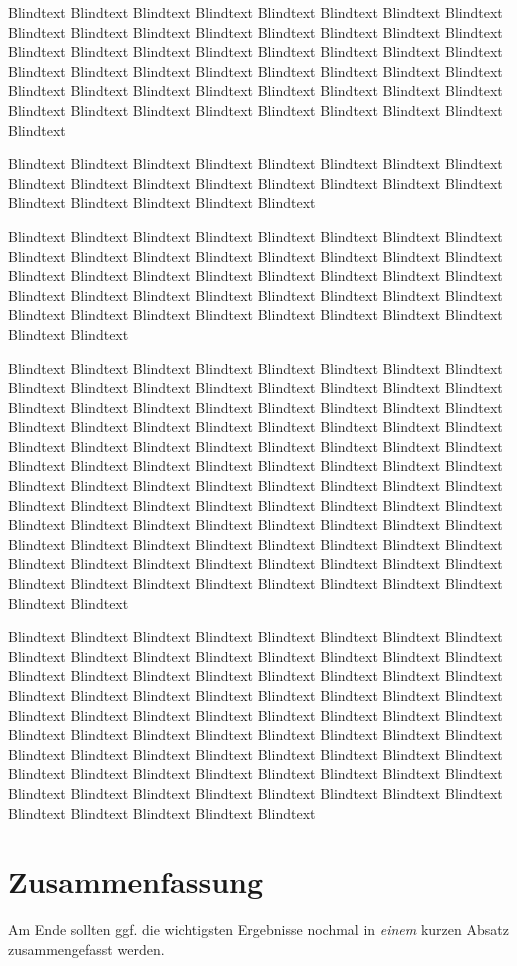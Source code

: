 Blindtext Blindtext Blindtext Blindtext Blindtext Blindtext Blindtext
Blindtext Blindtext Blindtext Blindtext Blindtext Blindtext Blindtext
Blindtext Blindtext Blindtext Blindtext Blindtext Blindtext Blindtext
Blindtext Blindtext Blindtext Blindtext Blindtext Blindtext Blindtext
Blindtext Blindtext Blindtext Blindtext Blindtext Blindtext Blindtext
Blindtext Blindtext Blindtext Blindtext Blindtext Blindtext Blindtext
Blindtext Blindtext Blindtext Blindtext Blindtext Blindtext Blindtext

Blindtext Blindtext Blindtext Blindtext Blindtext Blindtext Blindtext
Blindtext Blindtext Blindtext Blindtext Blindtext Blindtext Blindtext
Blindtext Blindtext Blindtext Blindtext Blindtext Blindtext Blindtext

Blindtext Blindtext Blindtext Blindtext Blindtext Blindtext Blindtext
Blindtext Blindtext Blindtext Blindtext Blindtext Blindtext Blindtext
Blindtext Blindtext Blindtext Blindtext Blindtext Blindtext Blindtext
Blindtext Blindtext Blindtext Blindtext Blindtext Blindtext Blindtext
Blindtext Blindtext Blindtext Blindtext Blindtext Blindtext Blindtext
Blindtext Blindtext Blindtext Blindtext Blindtext Blindtext Blindtext

Blindtext Blindtext Blindtext Blindtext Blindtext Blindtext Blindtext
Blindtext Blindtext Blindtext Blindtext Blindtext Blindtext Blindtext
Blindtext Blindtext Blindtext Blindtext Blindtext Blindtext Blindtext
Blindtext Blindtext Blindtext Blindtext Blindtext Blindtext Blindtext
Blindtext Blindtext Blindtext Blindtext Blindtext Blindtext Blindtext
Blindtext Blindtext Blindtext Blindtext Blindtext Blindtext Blindtext
Blindtext Blindtext Blindtext Blindtext Blindtext Blindtext Blindtext
Blindtext Blindtext Blindtext Blindtext Blindtext Blindtext Blindtext
Blindtext Blindtext Blindtext Blindtext Blindtext Blindtext Blindtext
Blindtext Blindtext Blindtext Blindtext Blindtext Blindtext Blindtext
Blindtext Blindtext Blindtext Blindtext Blindtext Blindtext Blindtext
Blindtext Blindtext Blindtext Blindtext Blindtext Blindtext Blindtext
Blindtext Blindtext Blindtext Blindtext Blindtext Blindtext Blindtext
Blindtext Blindtext Blindtext Blindtext Blindtext Blindtext Blindtext

Blindtext Blindtext Blindtext Blindtext Blindtext Blindtext Blindtext
Blindtext Blindtext Blindtext Blindtext Blindtext Blindtext Blindtext
Blindtext Blindtext Blindtext Blindtext Blindtext Blindtext Blindtext
Blindtext Blindtext Blindtext Blindtext Blindtext Blindtext Blindtext
Blindtext Blindtext Blindtext Blindtext Blindtext Blindtext Blindtext
Blindtext Blindtext Blindtext Blindtext Blindtext Blindtext Blindtext
Blindtext Blindtext Blindtext Blindtext Blindtext Blindtext Blindtext
Blindtext Blindtext Blindtext Blindtext Blindtext Blindtext Blindtext
Blindtext Blindtext Blindtext Blindtext Blindtext Blindtext Blindtext
Blindtext Blindtext Blindtext Blindtext Blindtext Blindtext Blindtext
Blindtext Blindtext Blindtext Blindtext Blindtext Blindtext Blindtext
\section{Zusammenfassung}
\label{ch:Analyse:sec:zusammenfassung}

Am Ende sollten ggf. die wichtigsten Ergebnisse nochmal in \emph{einem}
kurzen Absatz zusammengefasst werden.

